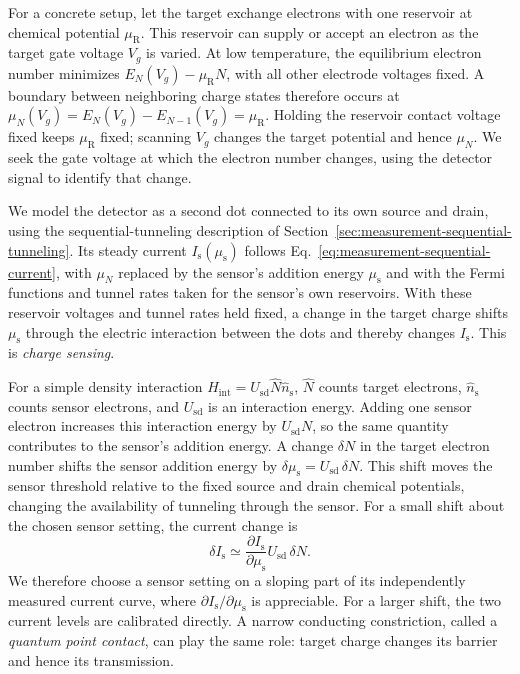 For a concrete setup, let the target exchange electrons with one
reservoir at chemical potential $\mu_{\mathrm R}$. This reservoir
can supply or accept an electron as the target gate voltage $V_g$
is varied. At low temperature, the equilibrium electron number
minimizes $E_N(V_g)-\mu_{\mathrm R}N$, with all other electrode
voltages fixed. A boundary between neighboring charge states
therefore occurs at $\mu_N(V_g)=E_N(V_g)-E_{N-1}(V_g)=\mu_{\mathrm R}$.
Holding the reservoir contact voltage fixed keeps $\mu_{\mathrm R}$
fixed; scanning $V_g$ changes the target potential and hence
$\mu_N$. We seek the gate voltage at which the electron number
changes, using the detector signal to identify that change.

We model the detector as a second dot connected to its own source
and drain, using the sequential-tunneling description of
Section~\ref{sec:measurement-sequential-tunneling}. Its steady
current $I_{\mathrm s}(\mu_{\mathrm s})$ follows
Eq.~\eqref{eq:measurement-sequential-current}, with $\mu_N$ replaced
by the sensor's addition energy $\mu_{\mathrm s}$ and with the
Fermi functions and tunnel rates taken for the sensor's own
reservoirs. With these reservoir voltages and tunnel rates held
fixed, a change in the target charge shifts $\mu_{\mathrm s}$
through the electric interaction between the dots and thereby
changes $I_{\mathrm s}$. This is \emph{charge sensing}.

For a simple density interaction
$H_{\mathrm{int}}=U_{\mathrm{sd}}\widehat N\widehat n_{\mathrm s}$,
$\widehat N$ counts target electrons, $\widehat n_{\mathrm s}$ counts
sensor electrons, and $U_{\mathrm{sd}}$ is an interaction energy.
Adding one sensor electron increases this interaction energy by
$U_{\mathrm{sd}}N$, so the same quantity contributes to the sensor's
addition energy. A change $\delta N$ in the target electron number
shifts the sensor addition energy by
$\delta\mu_{\mathrm s}=U_{\mathrm{sd}}\,\delta N$.
This shift moves the sensor threshold relative to the fixed source
and drain chemical potentials, changing the availability of
tunneling through the sensor.
For a small shift about the chosen sensor setting, the current
change is
\begin{equation}
 \delta I_{\mathrm s}\simeq
   \frac{\partial I_{\mathrm s}}{\partial\mu_{\mathrm s}}
      U_{\mathrm{sd}}\,\delta N.
 \label{eq:measurement-sensor-transduction}
\end{equation}
We therefore choose a sensor setting on a sloping part of its
independently measured current curve, where
$\partial I_{\mathrm s}/\partial\mu_{\mathrm s}$ is appreciable.
For a larger shift, the two current levels are calibrated directly.
A narrow conducting constriction, called a \emph{quantum point
contact}, can play the same role: target charge changes its barrier
and hence its transmission.

